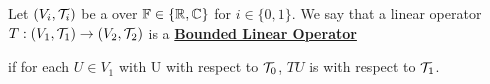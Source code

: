 \label{def:boundedlinearoperatorinatvs}
\newcommand{\BLO}[0]{
    \bf \hyperref[def:boundedlinearoperatorinatvs]{Bounded Linear Operator} \rm
}

\begin{df}
Let $(V_i,\mathcal{T}_i)$ be a \TVS over $\mathbb{F} \in \{\mathbb{R}, \mathbb{C}\}$ for $i \in \{0,1\}$. 
We say that a linear operator $T:(V_1, \mathcal{T}_1) \to (V_2, \mathcal{T}_2)$ is a \BLO
if for each $U \in V_1$ with U \TVSBounded with respect to $\mathcal{T}_0$, 
$TU$ is \TVSBounded with respect to $\mathcal{T}_1$. 
\end{df}
